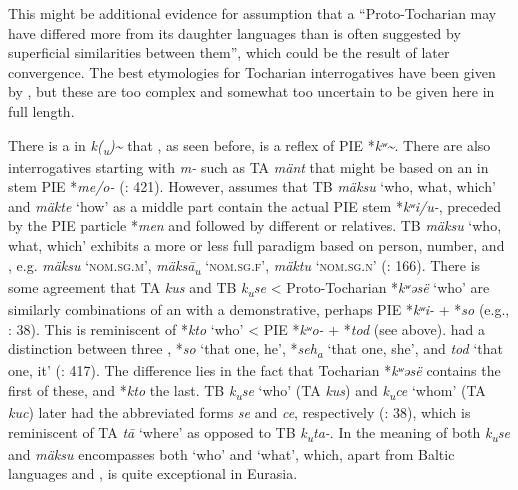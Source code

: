 This might be additional evidence for  assumption that a “Proto-Tocharian may have differed more from its daughter languages than is often suggested by superficial similarities between them”, which could be the result of later convergence. The best etymologies for Tocharian interrogatives have been given by \citet{Adams2013}, but these are too complex and somewhat too uncertain to be given here in full length.

There is a  in \textit{k(\textsubscript{u}}\textit{){\textasciitilde}} that , as seen before, is a reflex of PIE *\textit{kʷ}\textit{{\textasciitilde}}. There are also interrogatives starting with \textit{m-} such as TA \textit{mänt} that might be based on an in  stem PIE *\textit{me/o-} (\citealt{MalloryAdams2006}: 421). However, \citet{Adams2013} assumes that TB \textit{mäksu} ‘who, what, which’ and \textit{mäkte} ‘how’ as a middle part contain the actual PIE  stem *\textit{kʷ}\textit{i/u-}, preceded by the PIE particle *\textit{men} and followed by different  or relatives. TB \textit{mäksu} ‘who, what, which’ exhibits a more or less full paradigm based on person, number, and , e.g. \textit{mäksu} ‘\textsc{nom.sg.m}’, \textit{mäks\=a\textsubscript{u}} ‘\textsc{nom.sg.f}’, \textit{mäktu} ‘\textsc{nom.sg.n}’ (\citealt{Krause1960}: 166). There is some agreement that TA \textit{kus} and TB \textit{k\textsubscript{u}}\textit{se} < Proto-Tocharian *\textit{kʷ}\textit{əsë} ‘who’ are similarly combinations of an  with a demonstrative, perhaps PIE *\textit{kʷ}\textit{i-} + *\textit{so} (e.g., \citealt{Kim2012}: 38). This is reminiscent of  *\textit{kto} ‘who’ < PIE *\textit{kʷ}\textit{o-} + *\textit{tod} (see  above).  had a distinction between three , *\textit{so} ‘that one, he’, *\textit{seh\textsubscript{a}} ‘that one, she’, and \textit{tod} ‘that one, it’ (\citealt{MalloryAdams2006}: 417). The difference lies in the fact that Tocharian *\textit{kʷ}\textit{əsë} contains the first of these, and  *\textit{kto} the last. TB \textit{k\textsubscript{u}}\textit{se} ‘who’ (TA \textit{kus}) and \textit{k\textsubscript{u}}\textit{ce} ‘whom’ (TA \textit{kuc}) later had the abbreviated forms \textit{se} and \textit{ce}, respectively (\citealt{Kim2012}: 38), which is reminiscent of TA \textit{t\=a} ‘where’ as opposed to TB \textit{k\textsubscript{u}}\textit{ta-}. In  the meaning of both \textit{k\textsubscript{u}}\textit{se} and \textit{mäksu} encompasses both ‘who’ and ‘what’, which, apart from Baltic languages and , is quite exceptional in Eurasia.
